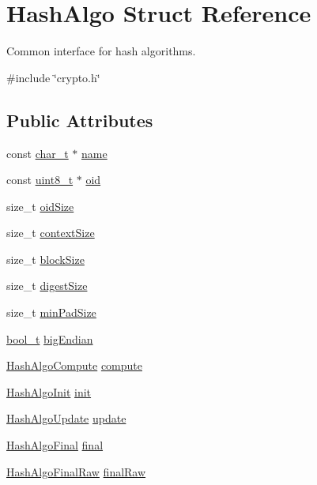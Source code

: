 \hypertarget{structHashAlgo}{}\section{Hash\+Algo Struct Reference}
\label{structHashAlgo}


Common interface for hash algorithms.  




{\ttfamily \#include \char`\"{}crypto.\+h\char`\"{}}

\subsection*{Public Attributes}
\begin{DoxyCompactItemize}
\item 
const \hyperlink{compiler__port_8h_a40bb5262bf908c328fbcfbe5d29d0201}{char\+\_\+t} $\ast$ \hyperlink{structHashAlgo_ab81a05d05e3730f55ce4a4b1036f4468}{name}
\item 
const \hyperlink{stdint_8h_aba7bc1797add20fe3efdf37ced1182c5}{uint8\+\_\+t} $\ast$ \hyperlink{structHashAlgo_a19af95385f1c3b7f8ccbe17bc078b673}{oid}
\item 
size\+\_\+t \hyperlink{structHashAlgo_a3c31200f0d9ee2ee3ad36b7e405814d2}{oid\+Size}
\item 
size\+\_\+t \hyperlink{structHashAlgo_ad087845190aa4163d8339cacd07fec3e}{context\+Size}
\item 
size\+\_\+t \hyperlink{structHashAlgo_a4157d353a7950634666f9abdc2e35a66}{block\+Size}
\item 
size\+\_\+t \hyperlink{structHashAlgo_a0c8ccdb22ea395ccdd8decd06401d22e}{digest\+Size}
\item 
size\+\_\+t \hyperlink{structHashAlgo_ac9d6aa5a36049d667037f67b2fdb4c15}{min\+Pad\+Size}
\item 
\hyperlink{compiler__port_8h_a812d16e5494522586b3784e55d479912}{bool\+\_\+t} \hyperlink{structHashAlgo_ad3de1766a80c361da014a824c9b06d14}{big\+Endian}
\item 
\hyperlink{cyclone__crypto_2core_2crypto_8h_a02fe893af436f6d8a574897a59748592}{Hash\+Algo\+Compute} \hyperlink{structHashAlgo_af06e5499992d76f215cc8329a2d6cbb3}{compute}
\item 
\hyperlink{cyclone__crypto_2core_2crypto_8h_afc5ce55917bd80825aa610848f402caf}{Hash\+Algo\+Init} \hyperlink{structHashAlgo_a77dcebcb5fd49cd6672ad6c97b55fdee}{init}
\item 
\hyperlink{cyclone__crypto_2core_2crypto_8h_a3d1fb45d6ca7822d20873ddbc8e39b89}{Hash\+Algo\+Update} \hyperlink{structHashAlgo_a83df6297595f1b9de65143df15fafda4}{update}
\item 
\hyperlink{cyclone__crypto_2core_2crypto_8h_a0a272470b5f95692d2e2e882f75844b3}{Hash\+Algo\+Final} \hyperlink{structHashAlgo_a8a1972d608540bbf31e1932f5403f51d}{final}
\item 
\hyperlink{cyclone__crypto_2core_2crypto_8h_a07eca3ea605d6ca12e824a9ef890b5ea}{Hash\+Algo\+Final\+Raw} \hyperlink{structHashAlgo_a6f92d7332b3309e74c45ac10080ed2ed}{final\+Raw}
\end{DoxyCompactItemize}


